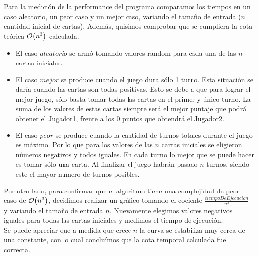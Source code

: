 \documentclass[11pt, a4paper, twoside]{article}
\begin{document}
{}

Para la medición de la performance del programa comparamos los tiempos en un caso aleatorio, un peor caso y 
un mejor caso, variando el tamaño de entrada ($n$ cantidad inicial de cartas). Además, quisimos comprobar que se 
cumpliera la cota teórica $\mathop{}\mathopen{}\mathcal{O}\mathopen{}\left(n^3\right)$ calculada. 

\begin{itemize}
\item El caso $aleatorio$ se armó tomando valores random para cada una de las $n$ cartas iniciales. 
\item El caso $mejor$ se produce cuando el juego dura sólo 1 turno. Esta situación se daría cuando las cartas son 
todas positivas. Esto se debe a que para lograr el mejor juego, sólo basta tomar todas las cartas en el primer y 
único turno. La suma de los valores de estas cartas siempre será el mejor puntaje que podrá obtener 
el Jugador1, frente a los 0 puntos que obtendrá el Jugador2. 
\item El caso $peor$ se produce cuando la cantidad de turnos totales durante el juego es máximo. 
Por lo que para los valores de las $n$ cartas iniciales se eligieron números negativos y todos iguales. 
En cada turno lo mejor que se puede hacer es tomar sólo una carta. Al finalizar el juego habrán pasado $n$ turnos, 
siendo este el mayor número de turnos posibles.
\end{itemize}


Por otro lado, para confirmar que el algoritmo tiene una complejidad de peor caso de $\mathop{}\mathopen{}\mathcal{O}\mathopen{}\left(n^3\right)$, decidimos 
realizar un gráfico tomando el cociente $\frac{tiempoDeEjecuci\acute{o}n}{n^3}$ y variando el tamaño de entrada $n$. 
Nuevamente elegimos valores negativos iguales para todas las cartas iniciales y medimos el tiempo de ejecución. \\
Se puede apreciar que a medida que crece $n$ la curva se estabiliza muy cerca de una constante, con lo cual 
concluímos que la cota temporal calculada fue correcta. 

  
\end{document}
